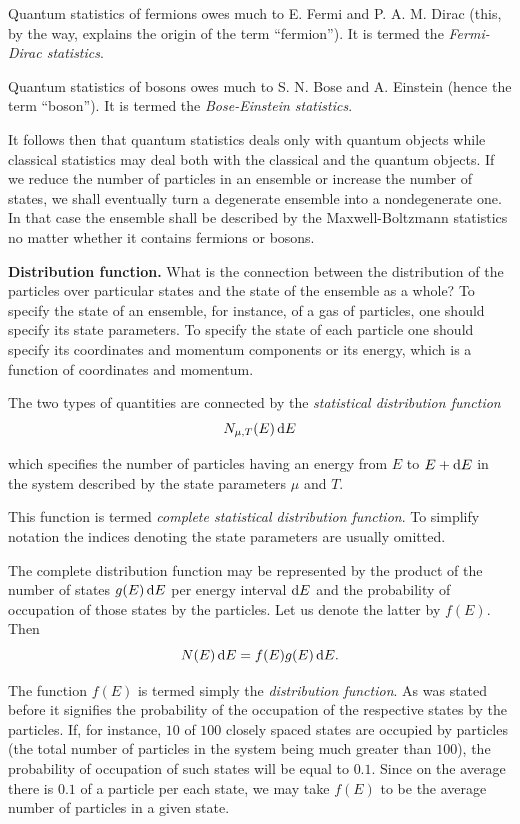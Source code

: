 Quantum statistics of fermions owes much to E. Fermi and P. A. M. Dirac (this, by the way, explains the origin of the term ``fermion''). It is termed the \textit{Fermi-Dirac statistics}.

Quantum statistics of bosons owes much to S. N. Bose and A. Einstein (hence the term ``boson''). It is termed the \textit{Bose-Einstein statistics}.

It follows then that quantum statistics deals only with quantum objects while classical statistics may deal both with the classical and the quantum objects. If we reduce the number of particles in an ensemble or increase the number of states, we shall eventually turn a degenerate ensemble into a nondegenerate one. In that case the ensemble shall be described by the Maxwell-Boltzmann statistics no matter whether it contains fermions or bosons.

\textbf{Distribution function.} What is the connection between the distribution of the particles over particular states and the state of the ensemble as a whole? To specify the state of an ensemble, for instance, of a gas of particles, one should specify its state parameters. To specify the state of each particle one should specify its coordinates and momentum components or its energy, which is a function of coordinates and momentum.

The two types of quantities are connected by the \textit{statistical distribution function}
\vspace{-12pt}
\begin{equation}\label{eq:3_12}
    N_{\mu,T}(E)\,\mathrm{d} E
\end{equation}

\noindent
which specifies the number of particles having an energy from $E$ to
$E+\mathrm{d} E$ in the system described by the state parameters $\mu$ and $T$.

This function is termed \textit{complete statistical distribution function}. To simplify notation the indices denoting the state parameters are usually omitted.

The complete distribution function may be represented by the product of the number of states $g(E)\,\mathrm{d} E$ per energy interval $\mathrm{d} E$ and the probability of occupation of those states by the particles. Let us denote the latter by $f(E)$. Then
\begin{equation}\label{eq:3_13}
    N(E)\,\mathrm{d} E = f(E) g(E)\, \mathrm{d} E.
\end{equation}

The function $f(E)$ is termed simply the \textit{distribution function}. As was stated before it signifies the probability of the occupation of the respective states by the particles. If, for instance, $10$ of $100$ closely spaced states are occupied by particles (the total number of particles in the system being much greater than $100$), the probability of occupation of such states will be equal to $0.1$. Since on the average there is $0.1$ of a particle per each state, we may take $f(E)$ to be the average number of particles in a given state.


